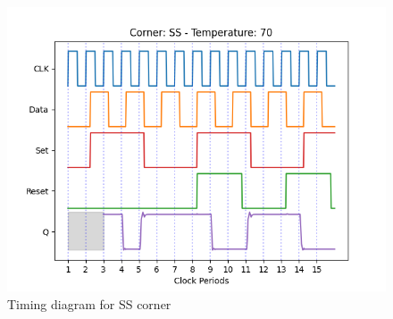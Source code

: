 \begin{figure}[H]
    \centering
    \begin{minipage}{0.5\textwidth}
        \centering
        \includegraphics[width=\textwidth]{Figures/Aimspice_Plots/SS_70.png}
        \caption{Timing diagram for SS corner}
        \label{fig:SS70}
    \end{minipage}%
\end{figure}

